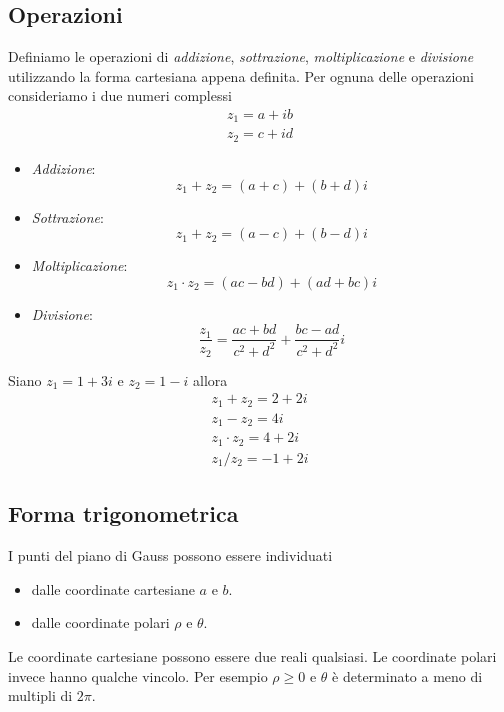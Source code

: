 \subsection{Operazioni}
Definiamo le operazioni di \emph{addizione}, \emph{sottrazione}, \emph{moltiplicazione} e
\emph{divisione} utilizzando la forma cartesiana appena definita.
Per ognuna delle operazioni consideriamo i due numeri complessi
\begin{gather*}
	z_1 = a + ib \\
	z_2 = c + id
\end{gather*}
\begin{itemize}
	\item \emph{Addizione}:
	      \begin{equation*}
		      z_1 + z_2 = (a + c) + (b + d)i
	      \end{equation*}
	\item \emph{Sottrazione}:
	      \begin{equation*}
		      z_1 + z_2 = (a - c) + (b - d)i
	      \end{equation*}
	\item \emph{Moltiplicazione}:
	      \begin{equation*}
		      z_1 \cdot z_2 = (ac - bd) + (ad + bc)i
	      \end{equation*}
	\item \emph{Divisione}:
	      \begin{equation*}
		      \frac{z_1}{z_2} = \frac{ac + bd}{c^2 + d^2} + \frac{bc - ad}{c^2 + d^2}i
	      \end{equation*}
\end{itemize}

\begin{example}
	Siano $z_1 = 1 + 3i$ e $z_2 = 1 - i$ allora
	\begin{gather*}
		z_1 + z_2 = 2 + 2i  \\
		z_1 - z_2 = 4i      \\
		z_1 \cdot z_2 = 4 + 2i  \\
		z_1 / z_2 = -1 + 2i
	\end{gather*}
\end{example}

\subsection{Forma trigonometrica}
I punti del piano di Gauss possono essere individuati
\begin{itemize}
	\item dalle coordinate cartesiane $a$ e $b$.
	\item dalle coordinate polari $\rho$ e $\theta$.
\end{itemize}
Le coordinate cartesiane possono essere due reali qualsiasi.
Le coordinate polari invece hanno qualche vincolo. Per esempio $\rho \geq 0$ e $\theta$ \`e
determinato a meno di multipli di $2 \pi$.

